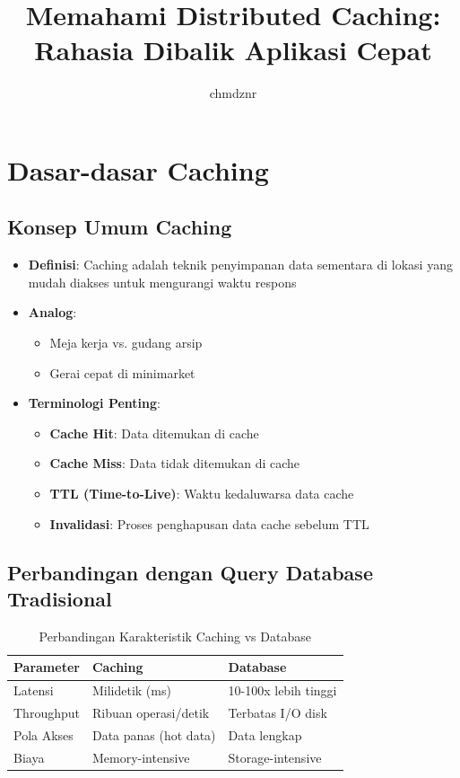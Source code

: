 \documentclass[11pt, a4paper]{book}
\title{Memahami Distributed Caching: Rahasia Dibalik Aplikasi Cepat}
\author{chmdznr}
\date{}
\begin{document}
	
	\maketitle
	
	\tableofcontents
	\listoffigures
	\clearpage
	
	\chapter{Dasar-dasar Caching}
	\label{chap:dasar-caching}
	
	\section{Konsep Umum Caching}
	\label{sec:konsep-umum}
	
	\begin{itemize}
		\item \textbf{Definisi}: Caching adalah teknik penyimpanan data sementara di lokasi yang mudah diakses untuk mengurangi waktu respons
		
		\item \textbf{Analog}:
		\begin{itemize}
			\item Meja kerja vs. gudang arsip
			\item Gerai cepat di minimarket
		\end{itemize}
		
		\item \textbf{Terminologi Penting}:
		\begin{itemize}
			\item \textbf{Cache Hit}: Data ditemukan di cache
			\item \textbf{Cache Miss}: Data tidak ditemukan di cache
			\item \textbf{TTL (Time-to-Live)}: Waktu kedaluwarsa data cache
			\item \textbf{Invalidasi}: Proses penghapusan data cache sebelum TTL
		\end{itemize}
	\end{itemize}
	
	\section{Perbandingan dengan Query Database Tradisional}
	\label{sec:perbandingan}
	
	\begin{table}[H]
		\centering
		\caption{Perbandingan Karakteristik Caching vs Database}
		\label{tab:perbandingan}
		\begin{tabularx}{\textwidth}{|l|X|X|}
			\hline
			\textbf{Parameter} & \textbf{Caching} & \textbf{Database} \\ \hline
			Latensi & Milidetik (ms) & 10-100x lebih tinggi \\ \hline
			Throughput & Ribuan operasi/detik & Terbatas I/O disk \\ \hline
			Pola Akses & Data panas (hot data) & Data lengkap \\ \hline
			Biaya & Memory-intensive & Storage-intensive \\ \hline
		\end{tabularx}
	\end{table}
	
\end{document}
